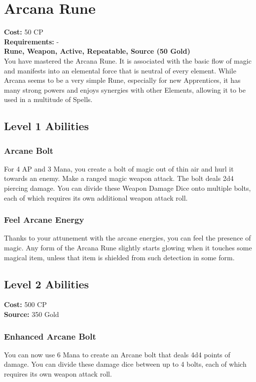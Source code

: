 \twocolumn
\section{Arcana Rune}\label{rune:arcana}
\textbf{Cost:} 50 CP\\
\textbf{Requirements:} -\\
\textbf{Rune, Weapon, Active, Repeatable, Source (50 Gold)}\\
You have mastered the Arcana Rune. It is associated with the basic flow of magic and manifests into an elemental force that is neutral of every element. While Arcana seems to be a very simple Rune, especially for new Apprentices, it has many strong powers and enjoys synergies with other Elements, allowing it to be used in a multitude of Spells.\\
\subsection{Level 1 Abilities}

\subsubsection{Arcane Bolt}
For 4 AP and 3 Mana, you create a bolt of magic out of thin air and hurl it towards an enemy. Make a ranged magic weapon attack. The bolt deals 2d4 piercing damage. You can divide these Weapon Damage Dice onto multiple bolts, each of which requires its own additional weapon attack roll.

\subsubsection{Feel Arcane Energy}
Thanks to your attunement with the arcane energies, you can feel the presence of magic. Any form of the Arcana Rune slightly starts glowing when it touches some magical item, unless that item is shielded from such detection in some form.

\subsection{Level 2 Abilities}
\textbf{Cost:} 500 CP\\
\textbf{Source:} 350 Gold
\subsubsection{Enhanced Arcane Bolt}
You can now use 6 Mana to create an Arcane bolt that deals 4d4 points of damage. You can divide these damage dice between up to 4 bolts, each of which requires its own weapon attack roll.

